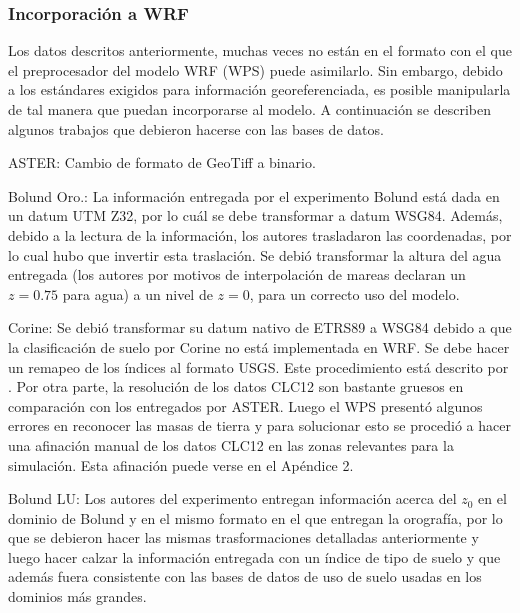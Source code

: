 \subsubsection{Incorporación a WRF}
Los datos descritos anteriormente, muchas veces no están en el formato con el que el preprocesador del modelo WRF (WPS) puede asimilarlo. Sin embargo, debido a los estándares exigidos para información georeferenciada, es posible manipularla de tal manera que puedan incorporarse al modelo. A continuación se describen algunos trabajos que debieron hacerse con las bases de datos.
\begin{itemize*}
	\item ASTER: Cambio de formato de GeoTiff a binario.
	\item Bolund Oro.: La información entregada por el experimento Bolund está dada en un datum UTM Z32, por lo cuál se debe transformar a datum WSG84. Además, debido a la lectura de la información, los autores trasladaron las coordenadas, por lo cual hubo que invertir esta traslación. Se debió transformar la altura del agua entregada (los autores por motivos de interpolación de mareas declaran un $z=0.75$ para agua) a un nivel de $z=0$, para un correcto uso del modelo. 
	\item Corine: Se debió transformar su datum nativo de ETRS89 a WSG84 debido a que la clasificación de suelo por Corine no está implementada en WRF. Se debe hacer un remapeo de los índices al formato USGS. Este procedimiento está descrito por \cite{Pineda2004}. Por otra parte, la resolución de los datos CLC12 son bastante gruesos en comparación con los entregados por ASTER. Luego el WPS presentó algunos errores en reconocer las masas de tierra y para solucionar esto se procedió a hacer una afinación manual de los datos CLC12 en las zonas relevantes para la simulación. Esta afinación puede verse en el Apéndice 2.
	\item Bolund LU: Los autores del experimento entregan información acerca del $z_0$ en el dominio de Bolund y en el mismo formato en el que entregan la orografía, por lo que se debieron hacer las mismas trasformaciones detalladas anteriormente y luego hacer calzar la información entregada con un índice de tipo de suelo y que además fuera consistente con las bases de datos de uso de suelo usadas en los dominios más grandes.
\end{itemize*}

